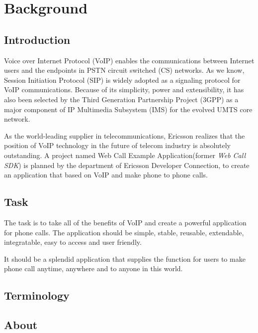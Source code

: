 \chapter{Background}
\label{sec:Background}


\section{Introduction}
\label{sec:Background:Introduction}

Voice over Internet Protocol (VoIP)\label{sym:VoIP} enables the communications between Internet users and the endpoints in PSTN circuit switched (CS)\label{sym:CS} networks. As we know, Session Initiation Protocol (SIP) is widely adopted as a signaling protocol for VoIP communications. Because of its simplicity, power and extensibility, it has also been selected by the Third Generation Partnership Project (3GPP)\label{sym:3GPP} as a major component of IP Multimedia Subsystem (IMS)\label{sym:IMS} for the evolved UMTS core network. 

As the world-leading supplier in telecommunications, Ericsson realizes that the position of VoIP technology in the future of telecom industry is absolutely outstanding. A project named Web Call Example Application(former \textit{Web Call SDK}) is planned by the department of Ericsson Developer Connection, to create an application that based on VoIP and make phone to phone calls. 

\section{Task}
\label{sec:Introduction:Task}

The task is to take all of the benefits of VoIP and create a powerful application for phone calls. The application should be simple, stable, reusable, extendable, integratable, easy to access and user friendly. 

It should be a splendid application that supplies the function for users to make phone call anytime, anywhere and to anyone in this world.



\section{Terminology}
\label{sec:Terminology}



\clearpage
\section{About}
\label{sec:Introduction:Background:About}

